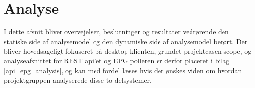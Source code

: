 \section{Analyse}
I dette afsnit bliver overvejelser, beslutninger og resultater vedrørende den statiske side af analysemodel og den dynamiske side af analysemodel berørt. Der bliver hovedsageligt fokuseret på desktop-klienten, grundet projektcasen scope, og analyseafsnittet for REST api'et og EPG polleren er derfor placeret i bilag \ref{api_epg_analysis}, og kan med fordel læses hvis der ønskes viden om hvordan projektgruppen analyserede disse to delsystemer. 


\newpage


\newpage


\newpage